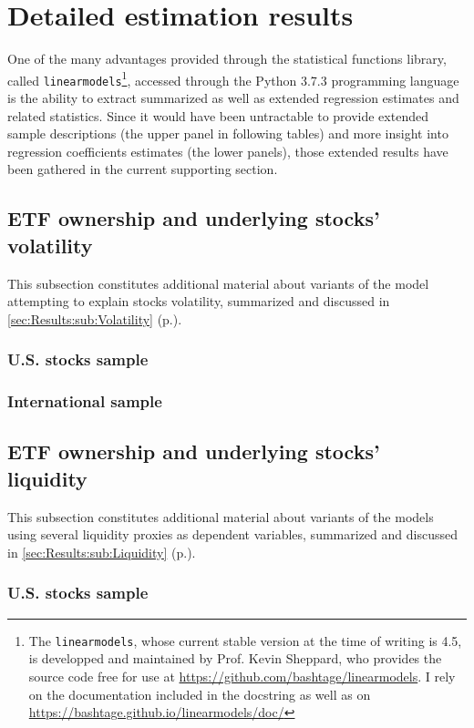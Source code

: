 \section{Detailed estimation results}
\label{app:sec:DetailedResults}
One of the many advantages provided through the statistical functions library, called \texttt{linearmodels}\footnote{The \texttt{linearmodels}, whose current stable version at the time of writing is 4.5, is developped and maintained by Prof. Kevin Sheppard, who provides the source code free for use at \url{https://github.com/bashtage/linearmodels}. I rely on the documentation included in the docstring as well as on \url{https://bashtage.github.io/linearmodels/doc/}}, accessed through the Python 3.7.3 programming language is the ability to extract summarized as well as extended regression estimates and related statistics. Since it would have been untractable to provide extended sample descriptions (the upper panel in following tables) and more insight into regression coefficients estimates (the lower panels), those extended results have been gathered in the current supporting section.
\subsection{ETF ownership and underlying stocks' volatility}
\label{app:sec:DetailedResults:Volatility}
This subsection constitutes additional material about variants of the model attempting to explain stocks volatility, summarized and discussed in \autoref{sec:Results:sub:Volatility} (p.\pageref{sec:Results:sub:Volatility}).
\subsubsection{U.S. stocks sample}
\subsubsection{International sample}

\subsection{ETF ownership and underlying stocks' liquidity}
\label{app:sec:DetailedResults:Liquidity}
This subsection constitutes additional material about variants of the models using several liquidity proxies as dependent variables, summarized and discussed in \autoref{sec:Results:sub:Liquidity} (p.\pageref{sec:Results:sub:Liquidity}).
\subsubsection{U.S. stocks sample}
